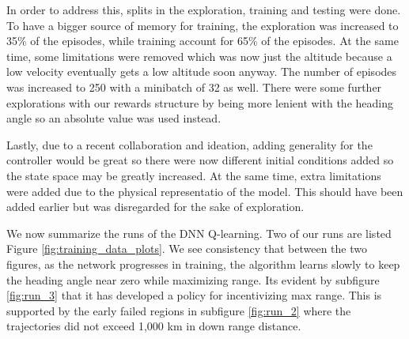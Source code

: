 \documentclass[11pt]{article} %
\begin{document}
In order to address this, splits in the exploration, training and testing were done. To have a bigger source of memory for training, the exploration was increased to 35\% of the episodes, 
while training account for 65\% of the episodes. At the same time, some limitations were removed which was now just the altitude because a low velocity eventually gets a low altitude soon anyway. 
The number of episodes was increased to 250 with a minibatch of 32 as well. There were some further explorations with our rewards structure by being more lenient with the heading angle 
so an absolute value was used instead. 

Lastly, due to a recent collaboration and ideation, adding generality for the controller would be great so there were now different initial conditions added so the state space may be greatly increased.
At the same time, extra limitations were added due to the physical representatio of the model. This should have been added earlier but was disregarded for the sake of exploration. 

We now summarize the runs of the DNN Q-learning. Two of our runs are listed Figure \ref{fig:training_data_plots}. 
We see consistency that between the two figures, as the network progresses in training, the algorithm 
learns slowly to keep the heading angle near zero while maximizing range. Its evident by subfigure 
\ref{fig:run_3} that it has developed a policy for incentivizing max range. This is supported by the 
early failed regions in subfigure \ref{fig:run_2} where the trajectories did not exceed 1,000 km 
in down range distance. 
\end{document}
